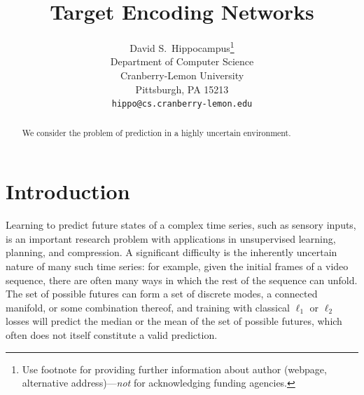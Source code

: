 \documentclass{article}
\title{Target Encoding Networks}
\author{
  David S.~Hippocampus\thanks{Use footnote for providing further
    information about author (webpage, alternative
    address)---\emph{not} for acknowledging funding agencies.} \\
  Department of Computer Science\\
  Cranberry-Lemon University\\
  Pittsburgh, PA 15213 \\
  \texttt{hippo@cs.cranberry-lemon.edu} \\
}
\begin{document}

\maketitle

\begin{abstract}
  We consider the problem of prediction in a highly uncertain environment.
\end{abstract}


\section{Introduction}

Learning to predict future states of a complex time series, such as sensory inputs, is an important research problem with applications in unsupervised learning, planning, and compression.
A significant difficulty is the inherently uncertain nature of many such time series: for example, given the initial frames of a video sequence, there are often many ways in which the rest of the sequence can unfold.
The set of possible futures can form a set of discrete modes, a connected manifold, or some combination thereof, and training with classical $\ell_1$ or $\ell_2$ losses will predict the median or the mean of the set of possible futures, which often does not itself constitute a valid prediction.
\end{document}
